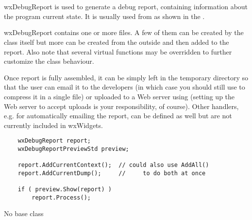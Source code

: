 
\section{}\label{wxdebugreport}

wxDebugReport is used to generate a debug report, containing information about
the program current state. It is usually used from 
 as shown in the 
.

wxDebugReport contains one or more files. A few of them can be created by the
class itself but more can be created from the outside and then added to the
report. Also note that several virtual functions may be overridden to further
customize the class behaviour.

Once report is fully assembled, it can be simply left in the temporary
directory so that the user can email it to the developers (in which case you
should still use  to
compress it in a single file) or uploaded to a Web server using 
 (setting up the Web server
to accept uploads is your responsibility, of course). Other handlers, e.g. for
automatically emailing the report, can be defined as well but are not currently
included in wxWidgets.


\begin{verbatim}
    wxDebugReport report;
    wxDebugReportPreviewStd preview;

    report.AddCurrentContext();  // could also use AddAll()
    report.AddCurrentDump();     //     to do both at once

    if ( preview.Show(report) )
        report.Process();
\end{verbatim}


No base class


